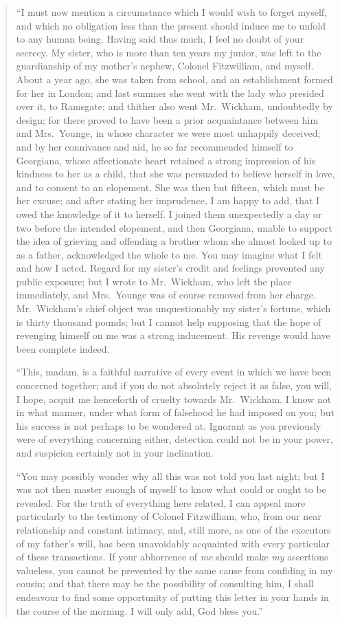 \documentclass[12pt,english,oneside]{book}
\begin{document}
\begin{quotation}
{}``I must now mention a circumstance which I would wish to forget
myself, and which no obligation less than the present should induce
me to unfold to any human being. Having said thus much, I feel no
doubt of your secrecy. My sister, who is more than ten years my junior,
was left to the guardianship of my mother's nephew, Colonel Fitzwilliam,
and myself. About a year ago, she was taken from school, and an establishment
formed for her in London; and last summer she went with the lady who
presided over it, to Ramsgate; and thither also went Mr.\ Wickham,
undoubtedly by design; for there proved to have been a prior acquaintance
between him and Mrs.\ Younge, in whose character we were most unhappily
deceived; and by her connivance and aid, he so far recommended himself
to Georgiana, whose affectionate heart retained a strong impression
of his kindness to her as a child, that she was persuaded to believe
herself in love, and to consent to an elopement. She was then but
fifteen, which must be her excuse; and after stating her imprudence,
I am happy to add, that I owed the knowledge of it to herself. I joined
them unexpectedly a day or two before the intended elopement, and
then Georgiana, unable to support the idea of grieving and offending
a brother whom she almost looked up to as a father, acknowledged the
whole to me. You may imagine what I felt and how I acted. Regard for
my sister's credit and feelings prevented any public exposure; but
I wrote to Mr.\ Wickham, who left the place immediately, and Mrs.\ Younge
was of course removed from her charge. Mr.\ Wickham's chief object
was unquestionably my sister's fortune, which is thirty thousand pounds;
but I cannot help supposing that the hope of revenging himself on
me was a strong inducement. His revenge would have been complete indeed.

{}``This, madam, is a faithful narrative of every event in which
we have been concerned together; and if you do not absolutely reject
it as false, you will, I hope, acquit me henceforth of cruelty towards
Mr.\ Wickham. I know not in what manner, under what form of falsehood
he had imposed on you; but his success is not perhaps to be wondered
at. Ignorant as you previously were of everything concerning either,
detection could not be in your power, and suspicion certainly not
in your inclination.

{}``You may possibly wonder why all this was not told you last night;
but I was not then master enough of myself to know what could or ought
to be revealed. For the truth of everything here related, I can appeal
more particularly to the testimony of Colonel Fitzwilliam, who, from
our near relationship and constant intimacy, and, still more, as one
of the executors of my father's will, has been unavoidably acquainted
with every particular of these transactions. If your abhorrence of
\textit{me} should make \textit{my} assertions valueless, you cannot
be prevented by the same cause from confiding in my cousin; and that
there may be the possibility of consulting him, I shall endeavour
to find some opportunity of putting this letter in your hands in the
course of the morning. I will only add, God bless you.''


\end{quotation}
\end{document}
